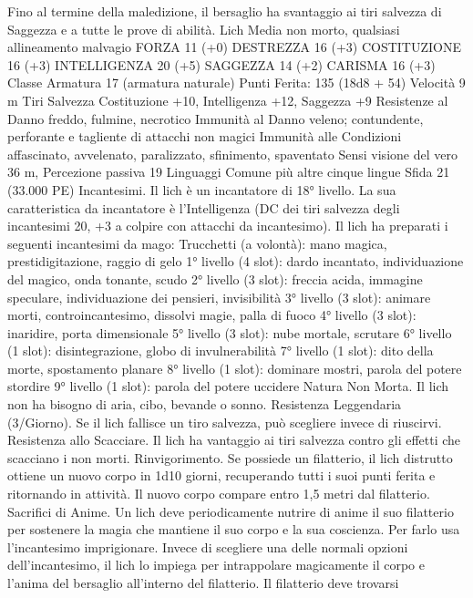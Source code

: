 \begin{multicols}{2}
Fino al termine della maledizione, il bersaglio ha svantaggio ai
tiri salvezza di Saggezza e a tutte le prove di abilità.
Lich
Media non morto, qualsiasi allineamento malvagio
FORZA 11 (+0)
DESTREZZA 16 (+3)
COSTITUZIONE 16 (+3)
INTELLIGENZA 20 (+5)
SAGGEZZA 14 (+2)
CARISMA 16 (+3)
Classe Armatura 17 (armatura naturale)
\hspace*{0pt}\hfill{Punti Ferita}: 135 (18d8 + 54)
Velocità 9 m
Tiri Salvezza Costituzione +10, Intelligenza +12, Saggezza +9
Resistenze al Danno freddo, fulmine, necrotico
Immunità al Danno veleno; contundente, perforante e tagliente
di attacchi non magici
Immunità alle Condizioni affascinato, avvelenato, paralizzato,
sfinimento, spaventato
Sensi visione del vero 36 m, Percezione passiva 19
Linguaggi Comune più altre cinque lingue
Sfida 21 (33.000 PE)
Incantesimi. Il lich è un incantatore di 18° livello. La sua
caratteristica da incantatore è l’Intelligenza (DC dei tiri salvezza
degli incantesimi 20, +3 a colpire con attacchi da incantesimo). Il
lich ha preparati i seguenti incantesimi da mago:
Trucchetti (a volontà): mano magica, prestidigitazione, raggio
di gelo
1° livello (4 slot): dardo incantato, individuazione del magico,
onda tonante, scudo
2° livello (3 slot): freccia acida, immagine speculare,
individuazione dei pensieri, invisibilità
3° livello (3 slot): animare morti, controincantesimo, dissolvi
magie, palla di fuoco
4° livello (3 slot): inaridire, porta dimensionale
5° livello (3 slot): nube mortale, scrutare
6° livello (1 slot): disintegrazione, globo di invulnerabilità
7° livello (1 slot): dito della morte, spostamento planare
8° livello (1 slot): dominare mostri, parola del potere stordire
9° livello (1 slot): parola del potere uccidere
Natura Non Morta. Il lich non ha bisogno di aria, cibo, bevande
o sonno.
Resistenza Leggendaria (3/Giorno). Se il lich fallisce un tiro
salvezza, può scegliere invece di riuscirvi.
Resistenza allo Scacciare. Il lich ha vantaggio ai tiri salvezza
contro gli effetti che scacciano i non morti.
Rinvigorimento. Se possiede un filatterio, il lich distrutto ottiene
un nuovo corpo in 1d10 giorni, recuperando tutti i suoi punti
ferita e ritornando in attività. Il nuovo corpo compare entro 1,5
metri dal filatterio.
Sacrifici di Anime. Un lich deve periodicamente nutrire di anime
il suo filatterio per sostenere la magia che mantiene il suo corpo
e la sua coscienza. Per farlo usa l’incantesimo imprigionare.
Invece di scegliere una delle normali opzioni dell’incantesimo, il
lich lo impiega per intrappolare magicamente il corpo e l’anima
del bersaglio all’interno del filatterio. Il filatterio deve trovarsi

\end{multicols}
